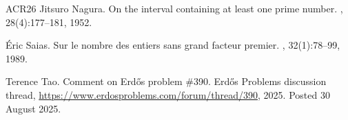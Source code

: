 \documentclass[11pt]{article}
\numberwithin{equation}{section}
\theoremstyle{definition}
\theoremstyle{remark}
\newcommand{\1}{\mathbf 1}
\begin{document}
\begin{thebibliography}{ACR{\etalchar{+}}26}
Jitsuro Nagura.
\newblock On the interval containing at least one prime number.
, 28(4):177--181, 1952.

{\'E}ric Saias.
\newblock Sur le nombre des entiers sans grand facteur premier.
, 32(1):78--99, 1989.

Terence Tao.
\newblock Comment on {Erd\H{o}s} problem \#390.
\newblock Erd\H{o}s Problems discussion thread,
  \url{https://www.erdosproblems.com/forum/thread/390}, 2025.
\newblock Posted 30 August 2025.

\end{thebibliography}
 
\end{document}
